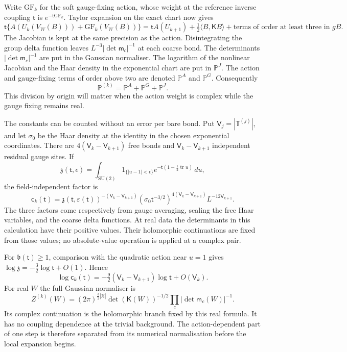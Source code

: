 \documentclass[11pt,letterpaper,reqno]{amsart}
\theoremstyle{definition}
\theoremstyle{remark}
\newcommand{\SU}{\mathrm{SU}}
\newcommand{\tr}{\operatorname{tr}}
\begin{document}
Write $\mathrm{GF}_k$ for the soft gauge-fixing action,
whose weight at the reference inverse coupling $\mathsf t$ is
$e^{-\mathsf t\mathrm{GF}_k}$. Taylor expansion on the exact chart now gives
\[
 \mathsf t\{A(U_k(V_W(B)))+\mathrm{GF}_k(V_W(B))\}
 =\mathsf tA(U_{k+1})+\tfrac12\langle B,\mathsf KB\rangle
       +\text{terms of order at least three in }gB.
\]
The Jacobian is kept at the same precision as the action.
Disintegrating the group delta function leaves
$L^{-3}|\det\mathsf m_c|^{-1}$ at each coarse bond.
The determinants $|\det\mathsf m_c|^{-1}$ are put in the
Gaussian normaliser. The logarithm of the nonlinear Jacobian
and the Haar density in the exponential chart are put in
$\mathbb P^J$. The action and gauge-fixing terms of order above
two are denoted $\mathbb P^A$ and $\mathbb P^G$. Consequently
\[
 \mathbb P^{(k)}=\mathbb P^A+\mathbb P^G+\mathbb P^J.
\]
This division by origin will matter when the action weight is
complex while the gauge fixing remains real.

The constants can be counted without an error per bare bond.
Put $\mathsf V_j=|\mathbb T^{(j)}|$, and let $\sigma_0$ be the Haar
density at the identity in the chosen exponential coordinates.
There are $4(\mathsf V_k-\mathsf V_{k+1})$ free bonds and $\mathsf V_k-\mathsf V_{k+1}$
independent residual gauge sites. If
\[
 \mathfrak z(\mathsf t,\epsilon)
 =\int_{\SU(2)}1_{\{|u-1|<\epsilon\}}
                    e^{-\mathsf t(1-\frac12\tr u)}\,du,
\]
the field-independent factor is
\begin{equation}\label{eq:deep-fibre-number}
 \mathsf c_k(\mathsf t)
 =\mathfrak z(\mathsf t,\varepsilon(\mathsf t))^{-(\mathsf V_k-\mathsf V_{k+1})}
   (\sigma_0\mathsf t^{-3/2})^{4(\mathsf V_k-\mathsf V_{k+1})}
                  L^{-12\mathsf V_{k+1}}.
\end{equation}
The three factors come respectively from gauge averaging, scaling
the free Haar variables, and the coarse delta functions. At real
data the determinants in this calculation have their positive
values. Their holomorphic continuations are fixed from those
values; no absolute-value operation is applied at a complex pair.

For $\mathfrak b(\mathsf t)\ge1$, comparison with the quadratic
action near $u=1$ gives
$\log\mathfrak z=-\frac32\log\mathsf t+O(1)$. Hence
\[
 \log\mathsf c_k(\mathsf t)
       =-\tfrac92(\mathsf V_k-\mathsf V_{k+1})\log\mathsf t+O(\mathsf V_k).
\]
For real $W$ the full Gaussian normaliser is
\[
 Z^{(k)}(W)
  =(2\pi)^{\frac32|\mathfrak X|}
      \det(\mathsf K(W))^{-1/2}
           \prod_c|\det\mathsf m_c(W)|^{-1}.
\]
Its complex continuation is the holomorphic branch fixed by
this real formula. It has no coupling dependence at the trivial
background. The
action-dependent part of one step is therefore separated from
its numerical normalisation before the local expansion begins.
\end{document}
